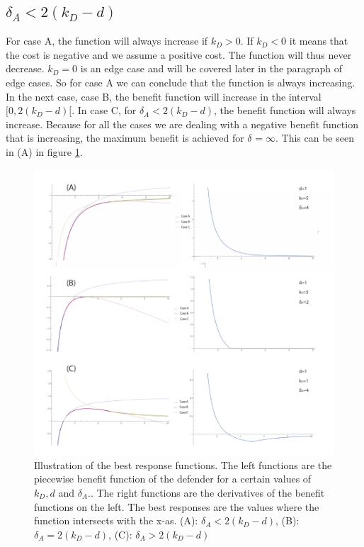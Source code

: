 \subsection*{$\delta_{A} < 2(k_{D} - d)$}
For case A, the function will always increase if $k_{D} > 0$. If $k_{D} < 0$ it means that the cost is negative and we assume a positive cost. The function will thus never decrease. $k_{D} =0$ is an edge case and will be covered later in the paragraph of edge cases. So for case A we can conclude that the function is always increasing. In the next case, case B, the benefit function will increase in the interval $[0, 2(k_{D}-d)[$. In case C, for $\delta_{A} < 2(k_{D} - d)$, the benefit function will always increase. Because for all the cases we are dealing with a negative benefit function that is increasing, the maximum benefit is achieved for $\delta_{} = \infty$. This can be seen in (A) in figure \ref{case1D}.

\begin{figure}[hbtp]
\centering
\includegraphics[scale=1]{Images/case1b.pdf}
\caption{ Illustration of the best response functions. The left functions are the piecewise benefit function of the defender for a certain values of $k_{D},d$ and $\delta_{A}$.. The right functions are the derivatives of the benefit functions on the left. The best responses are the values where the function intersects with the x-as. (A): $\delta_{A} < 2(k_{D}-d)$, (B): $\delta_{A} = 2(k_{D} - d)$, (C): $\delta_{A} > 2(k_{D} - d)$}
\label{case1D}
\end{figure}


